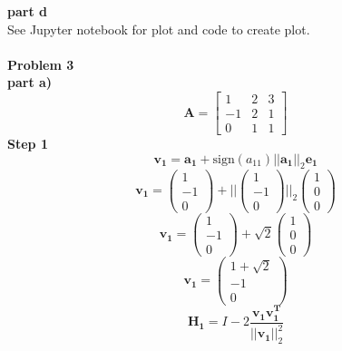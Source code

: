 \documentclass{article} %
\begin{document}
\textbf{part d} \\
See Jupyter notebook for plot and code to create plot.
\\
\\
\textbf{Problem 3} \\
\textbf{part a)} \\
\begin{equation}
\boldsymbol{A} = \begin{bmatrix} 1 & 2 & 3 \\ -1 & 2 & 1 \\ 0 & 1 & 1 \end{bmatrix}
\end{equation}
\textbf{Step 1} \\
\begin{equation}
\boldsymbol{v_1} = \boldsymbol{a_1} + \mbox{sign}(a_{11})||\boldsymbol{a_1}||_2 \boldsymbol{e_1}
\end{equation}
\begin{equation}
\boldsymbol{v_1} = \begin{pmatrix} 1 \\ -1 \\ 0 \end{pmatrix} + ||\begin{pmatrix} 1 \\ -1 \\ 0 \end{pmatrix}||_2 \begin{pmatrix} 1 \\ 0 \\ 0 \end{pmatrix}
\end{equation}
\begin{equation}
\boldsymbol{v_1} = \begin{pmatrix} 1 \\ -1 \\ 0 \end{pmatrix} + \sqrt{2} \begin{pmatrix} 1 \\ 0 \\ 0 \end{pmatrix}
\end{equation}
\begin{equation}
\boldsymbol{v_1} = \begin{pmatrix} 1 + \sqrt{2} \\ -1 \\ 0 \end{pmatrix}
\end{equation}
\begin{equation}
\boldsymbol{H_1} = I - 2\frac{\boldsymbol{v_1v_1^T}}{||\boldsymbol{v_1}||_2^2}
\end{equation}
\end{document}

